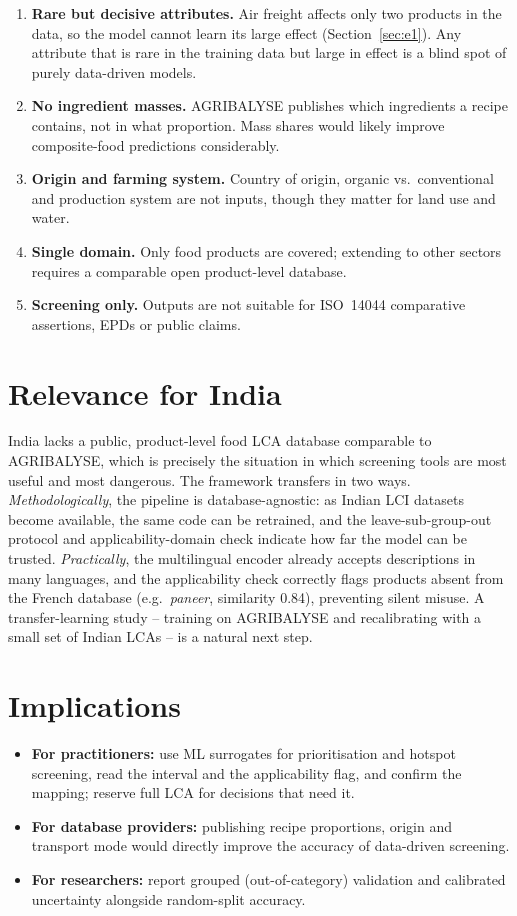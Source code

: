 \begin{enumerate}
  \item \textbf{Rare but decisive attributes.} Air freight affects only two products in the data,
  so the model cannot learn its large effect (Section~\ref{sec:e1}). Any attribute that is rare in
  the training data but large in effect is a blind spot of purely data-driven models.
  \item \textbf{No ingredient masses.} AGRIBALYSE publishes which ingredients a recipe contains, not
  in what proportion. Mass shares would likely improve composite-food predictions considerably.
  \item \textbf{Origin and farming system.} Country of origin, organic vs.\ conventional and
  production system are not inputs, though they matter for land use and water.
  \item \textbf{Single domain.} Only food products are covered; extending to other sectors requires
  a comparable open product-level database.
  \item \textbf{Screening only.} Outputs are not suitable for ISO~14044 comparative assertions,
  EPDs or public claims.
\end{enumerate}

\section{Relevance for India}

India lacks a public, product-level food LCA database comparable to AGRIBALYSE, which is precisely
the situation in which screening tools are most useful and most dangerous. The framework transfers
in two ways. \emph{Methodologically}, the pipeline is database-agnostic: as Indian LCI datasets
become available, the same code can be retrained, and the leave-sub-group-out protocol and
applicability-domain check indicate how far the model can be trusted. \emph{Practically}, the
multilingual encoder already accepts descriptions in many languages, and the applicability check
correctly flags products absent from the French database (e.g.\ \emph{paneer}, similarity 0.84),
preventing silent misuse. A transfer-learning study -- training on AGRIBALYSE and recalibrating with
a small set of Indian LCAs -- is a natural next step.

\section{Implications}

\begin{itemize}
  \item \textbf{For practitioners:} use ML surrogates for prioritisation and hotspot screening, read
  the interval and the applicability flag, and confirm the mapping; reserve full LCA for decisions
  that need it.
  \item \textbf{For database providers:} publishing recipe proportions, origin and transport mode
  would directly improve the accuracy of data-driven screening.
  \item \textbf{For researchers:} report grouped (out-of-category) validation and calibrated
  uncertainty alongside random-split accuracy.
\end{itemize}
